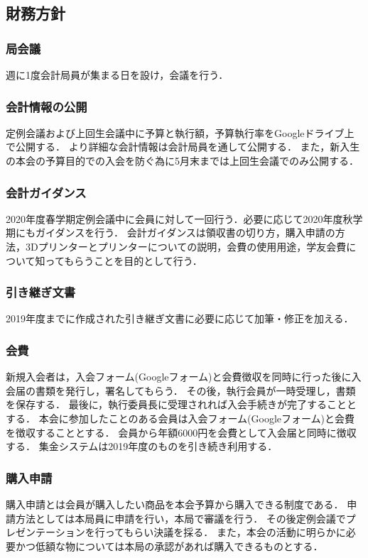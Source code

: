 \subsection*{財務方針}

\subsubsection*{局会議}
週に1度会計局員が集まる日を設け，会議を行う．

\subsubsection*{会計情報の公開}
定例会議および上回生会議中に予算と執行額，予算執行率をGoogleドライブ上で公開する．
より詳細な会計情報は会計局員を通して公開する．
また，新入生の本会の予算目的での入会を防ぐ為に5月末までは上回生会議でのみ公開する．

\subsubsection*{会計ガイダンス}
2020年度春学期定例会議中に会員に対して一回行う．必要に応じて2020年度秋学期にもガイダンスを行う．
会計ガイダンスは領収書の切り方，購入申請の方法，3Dプリンターとプリンターについての説明，会費の使用用途，学友会費について知ってもらうことを目的として行う．

\subsubsection*{引き継ぎ文書}
2019年度までに作成された引き継ぎ文書に必要に応じて加筆・修正を加える．

\subsubsection*{会費}
新規入会者は，入会フォーム(Googleフォーム)と会費徴収を同時に行った後に入会届の書類を発行し，署名してもらう．
その後，執行会員が一時受理し，書類を保存する．
最後に，執行委員長に受理されれば入会手続きが完了することとする．
本会に参加したことのある会員は入会フォーム(Googleフォーム)と会費を徴収することとする．
会員から年額6000円を会費として入会届と同時に徴収する．
集金システムは2019年度のものを引き続き利用する．

\subsubsection*{購入申請}
購入申請とは会員が購入したい商品を本会予算から購入できる制度である．
申請方法としては本局員に申請を行い，本局で審議を行う．
その後定例会議でプレゼンテーションを行ってもらい決議を採る．
また，本会の活動に明らかに必要かつ低額な物については本局の承認があれば購入できるものとする．

